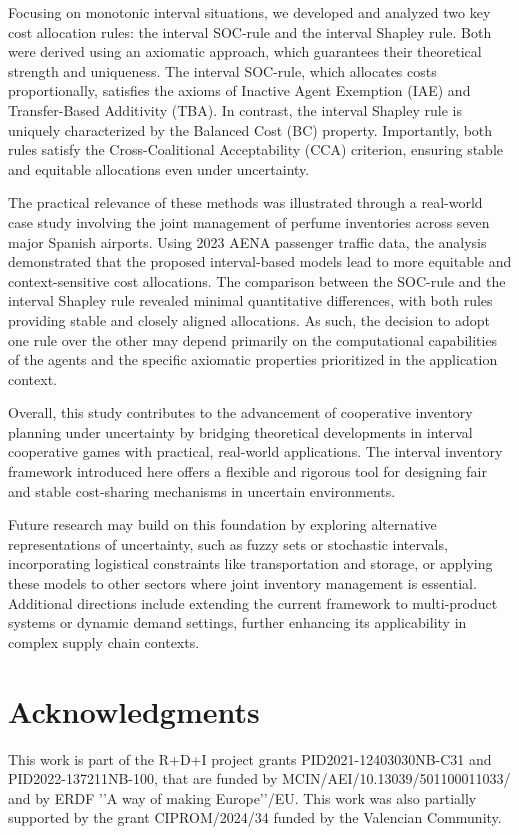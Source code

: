 \documentclass[12pt]{article}
\begin{document}
\noindent Focusing on monotonic interval situations, we developed and analyzed two key cost allocation rules: the interval SOC-rule and the interval Shapley rule. Both were derived using an axiomatic approach, which guarantees their theoretical strength and uniqueness. The interval SOC-rule, which allocates costs proportionally, satisfies the axioms of Inactive Agent Exemption (IAE) and Transfer-Based Additivity (TBA). In contrast, the interval Shapley rule is uniquely characterized by the Balanced Cost (BC) property. Importantly, both rules satisfy the Cross-Coalitional Acceptability (CCA) criterion, ensuring stable and equitable allocations even under uncertainty.

\noindent The practical relevance of these methods was illustrated through a real-world case study involving the joint management of perfume inventories across seven major Spanish airports. Using 2023 AENA passenger traffic data, the analysis demonstrated that the proposed interval-based models lead to more equitable and context-sensitive cost allocations. The comparison between the SOC-rule and the interval Shapley rule revealed minimal quantitative differences, with both rules providing stable and closely aligned allocations. As such, the decision to adopt one rule over the other may depend primarily on the computational capabilities of the agents and the specific axiomatic properties prioritized in the application context.

\noindent Overall, this study contributes to the advancement of cooperative inventory planning under uncertainty by bridging theoretical developments in interval cooperative games with practical, real-world applications. The interval inventory framework introduced here offers a flexible and rigorous tool for designing fair and stable cost-sharing mechanisms in uncertain environments.

\noindent Future research may build on this foundation by exploring alternative representations of uncertainty, such as fuzzy sets or stochastic intervals, incorporating logistical constraints like transportation and storage, or applying these models to other sectors where joint inventory management is essential. Additional directions include extending the current framework to multi-product systems or dynamic demand settings, further enhancing its applicability in complex supply chain contexts.


\section*{Acknowledgments}
This work is part of the R+D+I project grants   PID2021-12403030NB-C31 and PID2022-137211NB-100, that are funded by MCIN/AEI/10.13039/501100011033/ and by ERDF ’’A way of making Europe’’/EU. This work was also partially supported by the grant CIPROM/2024/34 funded by the Valencian Community.
\end{document}
